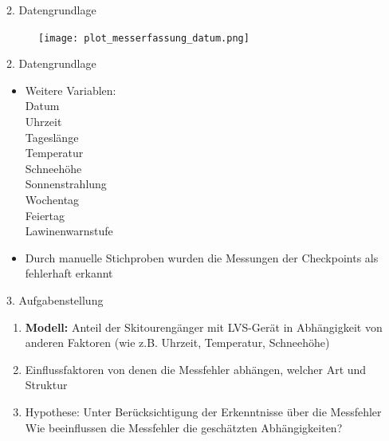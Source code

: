 \documentclass{beamer}
\begin{document}
\begin{frame}{2. Datengrundlage}

	\begin{figure}[H]
    \centering
    \texttt{[image: plot\_messerfassung\_datum.png]}
    \end{figure}
    
\end{frame}

\begin{frame}[t]{2. Datengrundlage}\vspace{4pt}
\begin{itemize}
    \item Weitere Variablen: \\
     Datum \\
     Uhrzeit \\
     Tageslänge \\
     Temperatur \\
     Schneehöhe \\  Sonnenstrahlung \\
     Wochentag \\
     Feiertag \\
     Lawinenwarnstufe \\
    \item Durch manuelle Stichproben wurden die Messungen der Checkpoints als fehlerhaft erkannt
\end{itemize}

\end{frame}
    


\begin{frame}[t]{3. Aufgabenstellung}\vspace{4pt}
\begin{enumerate}
    \item\textbf{Modell:} Anteil der Skitourengänger mit LVS-Gerät in Abhängigkeit von anderen Faktoren (wie z.B. Uhrzeit, Temperatur, Schneehöhe)
    \item Einﬂussfaktoren von denen die Messfehler abhängen, welcher Art und Struktur
    \item Hypothese: Unter Berücksichtigung der Erkenntnisse über die Messfehler \\
     Wie beeinflussen die Messfehler die geschätzten Abhängigkeiten?
\end{enumerate}
    
\end{frame}
\end{document}
